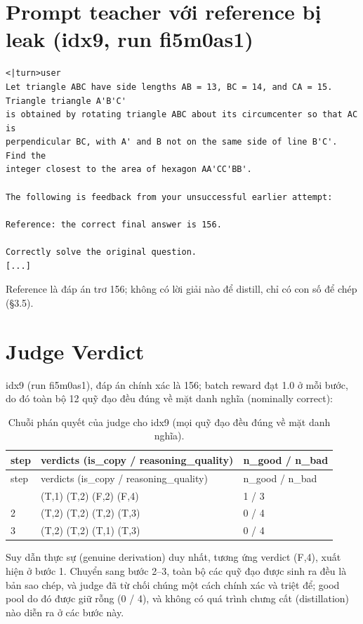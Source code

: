 \section{Prompt teacher với reference bị leak (idx9, run fi5m0as1)}\label{d.1-teacher-prompt-with-the-leaked-reference-idx9-run-fi5m0as1}

\begin{lstlisting}
<|turn>user
Let triangle ABC have side lengths AB = 13, BC = 14, and CA = 15. Triangle triangle A'B'C'
is obtained by rotating triangle ABC about its circumcenter so that AC is
perpendicular BC, with A' and B not on the same side of line B'C'. Find the
integer closest to the area of hexagon AA'CC'BB'.

The following is feedback from your unsuccessful earlier attempt:

Reference: the correct final answer is 156.

Correctly solve the original question.
[...]
\end{lstlisting}

Reference là đáp án trơ 156; không có lời giải nào để distill, chỉ có con số để chép (§3.5).

\section{Judge Verdict}\label{d.2-judge-verdict-sequences}

idx9 (run fi5m0as1), đáp án chính xác là 156; batch reward đạt 1.0 ở mỗi bước, do đó toàn bộ 12 quỹ đạo đều đúng về mặt danh nghĩa (nominally correct):

\begin{longtable}{lll}
\caption{Chuỗi phán quyết của judge cho idx9 (mọi quỹ đạo đều đúng về mặt danh nghĩa).}\\
\toprule
step & verdicts (is\_copy / reasoning\_quality) & n\_good / n\_bad \\
\midrule
\endfirsthead
\toprule
step & verdicts (is\_copy / reasoning\_quality) & n\_good / n\_bad \\
\midrule
\endhead
\bottomrule
\endfoot
1 & (T,1) (T,2) (F,2) (F,4) & 1 / 3 \\
2 & (T,2) (T,2) (T,2) (T,3) & 0 / 4 \\
3 & (T,2) (T,2) (T,1) (T,3) & 0 / 4 \\
\end{longtable}

Suy dẫn thực sự (genuine derivation) duy nhất, tương ứng verdict (F,4), xuất hiện ở bước 1. Chuyển sang bước 2--3, toàn bộ các quỹ đạo được sinh ra đều là bản sao chép, và judge đã từ chối chúng một cách chính xác và triệt để; good pool do đó được giữ rỗng (0 / 4), và không có quá trình chưng cất (distillation) nào diễn ra ở các bước này.

